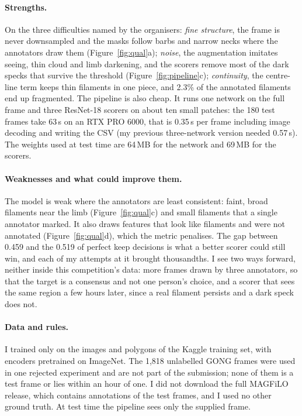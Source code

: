 \documentclass[sigconf]{acmart}
\begin{document}
\paragraph{Strengths.} On the three difficulties named by the organisers: \emph{fine structure},
the frame is never downsampled and the masks follow barbs and narrow necks where the annotators
draw them (Figure~\ref{fig:qual}a); \emph{noise}, the augmentation imitates seeing, thin cloud
and limb darkening, and the scorers remove most of the dark specks that survive the threshold
(Figure~\ref{fig:pipeline}c); \emph{continuity}, the centre-line term keeps thin filaments in one
piece, and 2.3\% of the annotated filaments end up fragmented. The pipeline is also cheap. It runs
one network on the full frame and three ResNet-18 scorers on about ten small patches: the 180
test frames take 63\,s on an RTX PRO 6000, that is 0.35\,s per frame including image decoding and
writing the CSV (my previous three-network version needed 0.57\,s). The weights used at test time
are 64\,MB for the network and 69\,MB for the scorers.

\paragraph{Weaknesses and what could improve them.} The model is weak where the annotators are
least consistent: faint, broad filaments near the limb (Figure~\ref{fig:qual}c) and small
filaments that a single annotator marked. It also draws features that look like filaments and
were not annotated (Figure~\ref{fig:qual}d), which the metric penalises. The gap between 0.459
and the 0.519 of perfect keep decisions is what a better scorer could still win, and each of my
attempts at it brought thousandths. I see two ways forward, neither inside this competition's
data: more frames drawn by three annotators, so that the target is a consensus and not one
person's choice, and a scorer that sees the same region a few hours later, since a real
filament persists and a dark speck does not.

\paragraph{Data and rules.} I trained only on the images and polygons of the Kaggle training set,
with encoders pretrained on ImageNet. The 1,818 unlabelled GONG frames were used in one rejected
experiment and are not part of the submission; none of them is a test frame or lies within an
hour of one. I did not download the full MAGFiLO release, which contains annotations of the test
frames, and I used no other ground truth. At test time the pipeline sees only the supplied frame.
\end{document}
